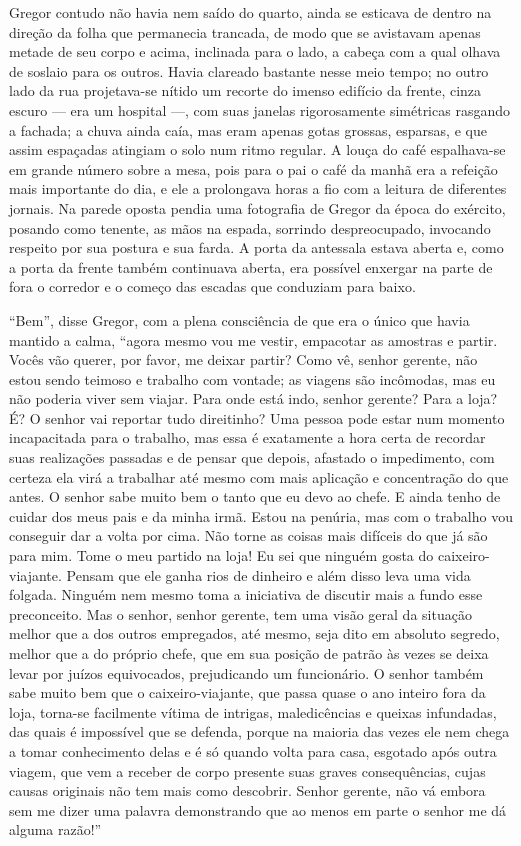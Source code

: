 Gregor contudo não havia nem saído do quarto, ainda se esticava de dentro
na direção da folha que permanecia trancada, de modo que se avistavam
apenas metade de seu corpo e acima, inclinada para o lado, a cabeça com a
qual olhava de soslaio para os outros. Havia clareado bastante nesse meio
tempo; no outro lado da rua projetava-se nítido um recorte do imenso
edifício da frente, cinza escuro --- era um hospital ---, com suas janelas
rigorosamente simétricas rasgando a fachada; a chuva ainda caía, mas eram
apenas gotas grossas, esparsas, e que assim espaçadas atingiam o solo num
ritmo regular. A louça do café espalhava-se em grande número sobre a mesa,
pois para o pai o café da manhã era a refeição mais importante do dia, e
ele a prolongava horas a fio com a leitura de diferentes jornais. Na
parede oposta pendia uma fotografia de Gregor da época do exército,
posando como tenente, as mãos na espada, sorrindo despreocupado, invocando
respeito por sua postura e sua farda. A porta da antessala estava aberta
e, como a porta da frente também continuava aberta, era possível enxergar
na parte de fora o corredor e o começo das escadas que conduziam para
baixo.

“Bem”, disse Gregor, com a plena consciência de que era o único que havia
mantido a calma, “agora mesmo vou me vestir, empacotar as amostras e
partir. Vocês vão querer, por favor, me deixar partir? Como vê, senhor
gerente, não estou sendo teimoso e trabalho com vontade; as viagens são
incômodas, mas eu não poderia viver sem viajar. Para onde está indo,
senhor gerente? Para a loja? É? O senhor vai reportar tudo direitinho? Uma
pessoa pode estar num momento incapacitada para o trabalho, mas essa é
exatamente a hora certa de recordar suas realizações passadas e de pensar
que depois, afastado o impedimento, com certeza ela virá a trabalhar até
mesmo com mais aplicação e concentração do que antes. O senhor sabe muito
bem o tanto que eu devo ao chefe. E ainda tenho de cuidar dos meus pais e
da minha irmã. Estou na penúria, mas com o trabalho vou conseguir dar a
volta por cima. Não torne as coisas mais difíceis do que já são para mim.
Tome o meu partido na loja! Eu sei que ninguém gosta do caixeiro-viajante.
Pensam que ele ganha rios de dinheiro e além disso leva uma vida folgada.
Ninguém nem mesmo toma a iniciativa de discutir mais a fundo esse
preconceito. Mas o senhor, senhor gerente, tem uma visão geral da situação
melhor que a dos outros empregados, até mesmo, seja dito em absoluto
segredo, melhor que a do próprio chefe, que em sua posição de patrão às
vezes se deixa levar por juízos equivocados, prejudicando um funcionário.
O senhor também sabe muito bem que o caixeiro-viajante, que passa quase o
ano inteiro fora da loja, torna-se facilmente vítima de intrigas,
maledicências e queixas infundadas, das quais é impossível que se defenda,
porque na maioria das vezes ele nem chega a tomar conhecimento delas e é só
quando volta para casa, esgotado após outra viagem, que vem a receber de
corpo presente suas graves consequências, cujas causas originais não tem
mais como descobrir. Senhor gerente, não vá embora sem me dizer uma
palavra demonstrando que ao menos em parte o senhor me dá alguma razão!”

